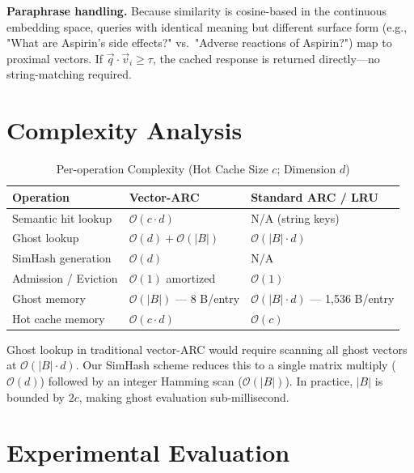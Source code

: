 \documentclass[conference,10pt]{IEEEtran}
\begin{document}
\textbf{Paraphrase handling.} Because similarity is cosine-based in the continuous embedding space, queries with identical meaning but different surface form (e.g., "What are Aspirin's side effects?" vs.\ "Adverse reactions of Aspirin?") map to proximal vectors. If $\vec{q}\cdot\vec{v}_i \ge \tau$, the cached response is returned directly—no string-matching required.

\section{Complexity Analysis}

\begin{table}[htbp]
\centering
\caption{Per-operation Complexity (Hot Cache Size $c$; Dimension $d$)}
\label{tab:complexity}
\begin{tabularx}{\columnwidth}{@{}lXX@{}}
\toprule
\textbf{Operation} & \textbf{Vector-ARC} & \textbf{Standard ARC / LRU} \\ \midrule
Semantic hit lookup & $\mathcal{O}(c \cdot d)$ & N/A (string keys) \\
Ghost lookup & $\mathcal{O}(d) + \mathcal{O}(|B|)$ & $\mathcal{O}(|B| \cdot d)$ \\
SimHash generation & $\mathcal{O}(d)$ & N/A \\
Admission / Eviction & $\mathcal{O}(1)$ amortized & $\mathcal{O}(1)$ \\
Ghost memory & $\mathcal{O}(|B|)$ — 8 B/entry & $\mathcal{O}(|B| \cdot d)$ — 1,536 B/entry \\
Hot cache memory & $\mathcal{O}(c \cdot d)$ & $\mathcal{O}(c)$ \\
\bottomrule
\end{tabularx}
\end{table}

Ghost lookup in traditional vector-ARC would require scanning all ghost vectors at $\mathcal{O}(|B|\cdot d)$. Our SimHash scheme reduces this to a single matrix multiply ($\mathcal{O}(d)$) followed by an integer Hamming scan ($\mathcal{O}(|B|)$). In practice, $|B|$ is bounded by $2c$, making ghost evaluation sub-millisecond.

\section{Experimental Evaluation}
\end{document}
